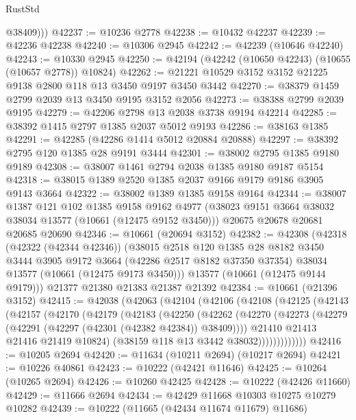 \begin{lexlean}{RustStd}
\begin{coremodule}
          @38409)))
@42237 := @10236 @2778
@42238 := @10432 @42237
@42239 := @42236 @42238
@42240 := @10306 @2945
@42242 := @42239 (@10646 @42240)
@42243 := @10330 @2945
@42250 := @42194 (@42242 (@10650 @42243) (@10655 (@10657 @2778)) @10824)
@42262 := @21221 @10529 @3152 @3152 @21225 @9138 @2800 @118 @13 @3450 @9197 @3450 @3442
@42270 := @38379 @1459 @2799 @2039 @13 @3450 @9195 @3152 @2056
@42273 := @38388 @2799 @2039 @9195
@42279 := @42206 @2798 @13 @2038 @3738 @9194 @42214
@42285 := @38392 @1415 @2797 @1385 @2037 @5012 @9193
@42286 := @38163 @1385
@42291 := @42285 (@42286 @1414 @5012 @20884 @20888)
@42297 := @38392 @2795 @120 @1385 @28 @9191 @3444
@42301 := @38002 @2795 @1385 @9180 @9189
@42308 := @38007 @1461 @2794 @2038 @1385 @9180 @9187 @5154
@42318 := @38015 @1389 @2520 @1385 @2037 @9166 @9179 @9186 @3905 @9143 @3664
@42322 := @38002 @1389 @1385 @9158 @9164
@42344 := @38007
    @1387
    @121
    @102
    @1385
    @9158
    @9162
    @4977
    (@38023 @9151 @3664 @38032 @38034 @13577 (@10661 (@12475 @9152 @3450)))
    @20675
    @20678
    @20681
    @20685
    @20690
@42346 := @10661 (@20694 @3152)
@42382 := @42308
    (@42318
      (@42322 (@42344 @42346))
      (@38015
        @2518
        @120
        @1385
        @28
        @8182
        @3450
        @3444
        @3905
        @9172
        @3664
        (@42286 @2517 @8182 @37350 @37354)
        @38034
        @13577
        (@10661 (@12475 @9173 @3450)))
      @13577
      (@10661 (@12475 @9144 @9179)))
    @21377
    @21380
    @21383
    @21387
    @21392
@42384 := @10661 (@21396 @3152)
@42415 := @42038
    (@42063
      (@42104
        (@42106
          (@42108
            (@42125
              (@42143
                (@42157
                  (@42170
                    (@42179
                      (@42183
                        (@42250
                          (@42262
                            (@42270
                              (@42273 (@42279 (@42291 (@42297 (@42301 (@42382 @42384)) @38409))))
                              @21410
                              @21413
                              @21416
                              @21419
                              @10824)
                            (@38159 @118 @13 @3442 @38032)))))))))))))
@42416 := @10205 @2694
@42420 := @11634 (@10211 @2694) (@10217 @2694)
@42421 := @10226 @40861
@42423 := @10222 (@42421 @11646)
@42425 := @10264 (@10265 @2694)
@42426 := @10260 @42425
@42428 := @10222 (@42426 @11660)
@42429 := @11666 @2694
@42434 := @42429 @11668 @10303 @10275 @10279 @10282
@42439 := @10222 (@11665 (@42434 @11674 @11679) @11686)

\end{coremodule}
\end{lexlean}
